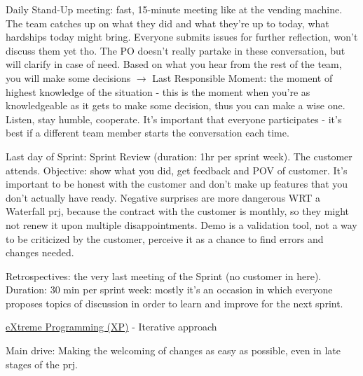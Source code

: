 \noindent Daily Stand-Up meeting: fast, 15-minute meeting like at the vending machine. The team catches up on what they did and what they're up to today, what hardships today might bring. Everyone submits issues for further reflection, won't discuss them yet tho. The PO doesn't really partake in these conversation, but will clarify in case of need. Based on what you hear from the rest of the team, you will make some decisions $\rightarrow$ Last Responsible Moment: the moment of highest knowledge of the situation - this is the moment when you're as knowledgeable as it gets to make some decision, thus you can make a wise one. Listen, stay humble, cooperate. It's important that everyone participates - it's best if a different team member starts the conversation each time.

\noindent Last day of Sprint: Sprint Review (duration: 1hr per sprint week). The customer attends. Objective: show what you did, get feedback and POV of customer. It's important to be honest with the customer and don't make up features that you don't actually have ready. Negative surprises are more dangerous WRT a Waterfall prj, because the contract with the customer is monthly, so they might not renew it upon multiple disappointments. Demo is a validation tool, not a way to be criticized by the customer, perceive it as a chance to find errors and changes needed.

\noindent Retrospectives: the very last meeting of the Sprint (no customer in here). Duration: 30 min per sprint week: mostly it's an occasion in which everyone proposes topics of discussion in order to learn and improve for the next sprint.

\newpage\noindent \underline{eXtreme Programming (XP)} - Iterative approach

 \noindent Main drive: Making the welcoming of changes as easy as possible, even in late stages of the prj.

